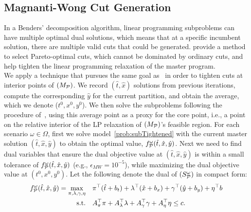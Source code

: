 \documentclass[11pt]{article}
\newcommand{\cP}{{\cal P}}
\begin{document}
	\subsection{Magnanti-Wong Cut Generation} \label{subsec:MW}
	In a Benders' decomposition algorithm, linear programming subproblems can have multiple optimal dual solutions, which means that at a specific incumbent solution, there are multiple valid cuts that could be generated. \citet{magnanti1981accelerating} provide a method to select Pareto-optimal cuts, which cannot be dominated by ordinary cuts, 
	and help tighten the linear programming relaxation of the master program.\\
	\newline
	We apply a technique that pursues the same goal as~\citeauthor{magnanti1981accelerating} in order to tighten cuts at interior points of \((M_\cP)\). We record \((\hat{t},\hat{x})\) solutions from previous iterations, compute the corresponding \(\hat{y}\) for the current partition, and obtain the average, which we denote (\(t^0,x^0,y^0\)). We then solve the subproblems following the procedure of~\citet{magnanti1981accelerating}, using this average point as a proxy for the core point, i.e., a point on the relative interior of the LP relaxation of \((M_{\cP})\)'s feasible region. For each scenario \(\omega \in \Omega\), first we solve model~\eqref{prob:subTightened} with the current master solution  \((\hat{t},\hat{x},\hat{y})\) to obtain the optimal value, \(f^{\omega}_{\cP}(\hat{t},\hat{x},\hat{y})\). Next we need to find dual variables that ensure the dual objective value at \((\hat{t},\hat{x},\hat{y})\) is within a small tolerance of \(f^{\omega}_{\cP}(\hat{t},\hat{x},\hat{y})\) (e.g., \(\epsilon_{MW} = 10^{-5}\)), while maximizing the dual objective value at \((t^0,x^0,y^0)\). Let the following denote the dual of \((S^\omega_\cP)\) in compact form:
	\begin{subequations} \label{prob:subdual}
		\begin{align}
		f^{\omega}_{\cP}(\hat{t},\hat{x},\hat{y})=
		\max_{\pi,\lambda,\gamma,\eta} \quad & \pi^\top (\hat{t} + b_t) + \lambda^\top (\hat{x} + b_x) + \gamma^\top (\hat{y} + b_y) + \eta^\top b \\
		\text{s.t.} \quad & A^\top_{\pi} \pi + A^\top_{\lambda} \lambda + A^\top_{\gamma} \gamma + A^\top_{\eta} \eta \leq c.
		\end{align}
	\end{subequations}
\end{document}
